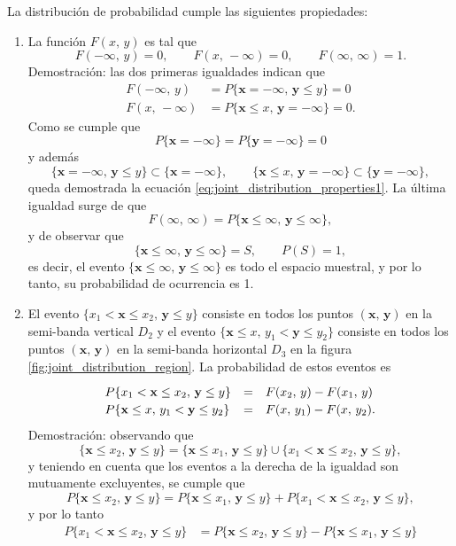 \documentclass[a4paper]{report}
\newcommand{\x}{\mathbf{x}}
\newcommand{\y}{\mathbf{y}}
\begin{document}
La distribución de probabilidad cumple las siguientes propiedades:
\begin{enumerate}[1.]
 \item La función \(F(x,\,y)\) es tal que
 \[
  F(-\infty,\,y)=0,\qquad F(x,\,-\infty)=0,\qquad F(\infty,\,\infty)=1.
 \]
 Demostración: las dos primeras igualdades indican que
 \begin{equation}\label{eq:joint_distribution_properties1}
 \begin{aligned}
    F(-\infty,\,y)&=P\{\x=-\infty,\,\y\leq y\}=0\\
    F(x,\,-\infty)&=P\{\x\leq x,\,\y=-\infty\}=0.
 \end{aligned}
 \end{equation}
 Como se cumple que
 \[
  P\{\x=-\infty\}=P\{\y=-\infty\}=0
 \]
 y además
 \[
  \{\x=-\infty,\,\y\leq y\}\subset \{\x=-\infty\},\qquad \{\x\leq x,\,\y=-\infty\}\subset \{\y=-\infty\},
 \]
 queda demostrada la ecuación \ref{eq:joint_distribution_properties1}. La última igualdad surge de que
 \[
  F(\infty,\,\infty)=P\{\x\leq\infty,\,\y\leq \infty\},
 \]
 y de observar que 
 \[
  \{\x\leq\infty,\,\y\leq \infty\}=S, \qquad P(S)=1,
 \]
 es decir, el evento \(\{\x\leq\infty,\,\y\leq \infty\}\) es todo el espacio muestral, y por lo tanto, su probabilidad de ocurrencia es 1.
 \item El evento \(\{x_1<\x\leq x_2,\,\y\leq y\}\) consiste en todos los puntos \((\x,\,\y)\) en la semi-banda vertical \(D_2\) y el evento \(\{\x\leq x,\,y_1<\y\leq y_2\}\) consiste en todos los puntos \((\x,\,\y)\) en la semi-banda horizontal \(D_3\) en la figura \ref{fig:joint_distribution_region}. La probabilidad de estos eventos es
 \begin{equation}\label{eq:joint_distribution_properties2}
 \def\arraystretch{1.2}
 \begin{array}{lll}
    P\{x_1<\x\leq x_2,\,\y\leq y\}&=&F(x_2,\,y)-F(x_1,\,y)\\
    P\{\x\leq x,\,y_1<\y\leq y_2\}&=&F(x,\,y_1)-F(x,\,y_2).
 \end{array}
 \end{equation} 
Demostración: observando que
\[
 \{\x\leq x_2,\,\y\leq y\}=\{\x\leq x_1,\,\y\leq y\}\cup\{x_1<\x\leq x_2,\,\y\leq y\},
\]
y teniendo en cuenta que los eventos a la derecha de la igualdad son mutuamente excluyentes, se cumple que
\[
 P\{\x\leq x_2,\,\y\leq y\}=P\{\x\leq x_1,\,\y\leq y\}+P\{x_1<\x\leq x_2,\,\y\leq y\},
\]
y por lo tanto
\begin{align*}
 P\{x_1<\x\leq x_2,\,\y\leq y\}&=P\{\x\leq x_2,\,\y\leq y\}-P\{\x\leq x_1,\,\y\leq y\}\\

\end{align*}
\end{enumerate}
\end{document}
